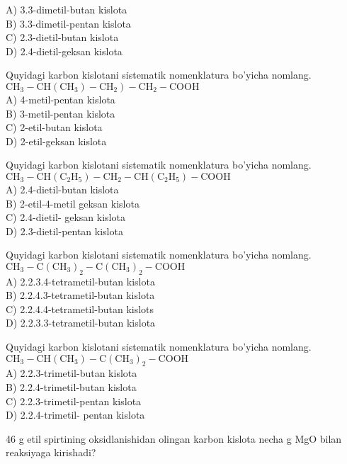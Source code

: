 A) 3.3-dimetil-butan kislota\\
B) 3.3-dimetil-pentan kislota\\
C) 2.3-dietil-butan kislota\\
D) 2.4-dietil-geksan kislota
  \item Quyidagi karbon kislotani sistematik nomenklatura bo'yicha nomlang.\\
$\left.\mathrm{CH}_{3}-\mathrm{CH}\left(\mathrm{CH}_{3}\right)-\mathrm{CH}_{2}\right)-\mathrm{CH}_{2}-\mathrm{COOH}$\\
A) 4-metil-pentan kislota\\
B) 3-metil-pentan kislota\\
C) 2-etil-butan kislota\\
D) 2-etil-geksan kislota
  \item Quyidagi karbon kislotani sistematik nomenklatura bo'yicha nomlang.\\
$\mathrm{CH}_{3}-\mathrm{CH}\left(\mathrm{C}_{2} \mathrm{H}_{5}\right)-\mathrm{CH}_{2}-\mathrm{CH}\left(\mathrm{C}_{2} \mathrm{H}_{5}\right)-\mathrm{COOH}$\\
A) 2.4-dietil-butan kislota\\
B) 2-etil-4-metil geksan kislota\\
C) 2.4-dietil- geksan kislota\\
D) 2.3-dietil-pentan kislota
  \item Quyidagi karbon kislotani sistematik nomenklatura bo'yicha nomlang.\\
$\mathrm{CH}_{3}-\mathrm{C}\left(\mathrm{CH}_{3}\right)_{2}-\mathrm{C}\left(\mathrm{CH}_{3}\right)_{2}-\mathrm{COOH}$\\
A) 2.2.3.4-tetrametil-butan kislota\\
B) 2.2.4.3-tetrametil-butan kislota\\
C) 2.2.4.4-tetrametil-butan kislots\\
D) 2.2.3.3-tetrametil-butan kislota
  \item Quyidagi karbon kislotani sistematik nomenklatura bo'yicha nomlang.\\
$\mathrm{CH}_{3}-\mathrm{CH}\left(\mathrm{CH}_{3}\right)-\mathrm{C}\left(\mathrm{CH}_{3}\right)_{2}-\mathrm{COOH}$\\
A) 2.2.3-trimetil-butan kislota\\
B) 2.2.4-trimetil-butan kislota\\
C) 2.2.3-trimetil-pentan kislota\\
D) 2.2.4-trimetil- pentan kislota
  \item 46 g etil spirtining oksidlanishidan olingan karbon kislota necha g MgO bilan reaksiyaga kirishadi?\\
